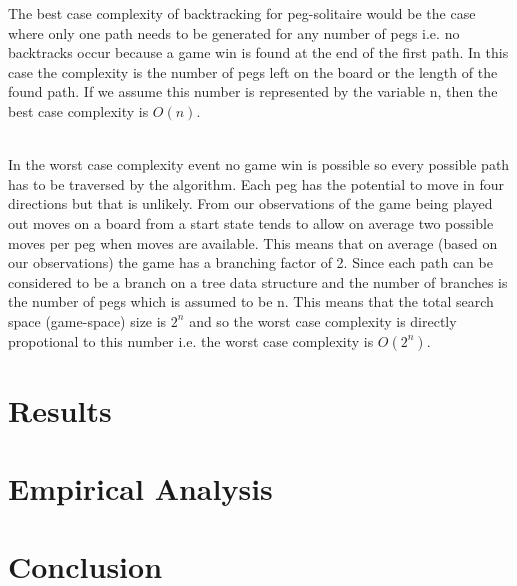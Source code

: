 \documentclass[a4paper]{article}
\begin{document}
\noindent The best case complexity of backtracking for peg-solitaire would be the case where only one path needs to be generated for any number of pegs i.e. no backtracks occur because a game win is found at the end of the first path. In this case the complexity is the number of pegs left on the board or the length of the found path. If we assume this number is represented by the variable n, then the best case complexity is $O(n)$.\\\


\noindent In the worst case complexity event no game win is possible so every possible path has to be traversed by the algorithm. Each peg has the potential to move in four directions but that is unlikely. From our observations of the game being played out moves on a board from a start state tends to allow on average two possible moves per peg when moves are available. This means that on average (based on our observations) the game has a branching factor of 2. Since each path can be considered to be a branch on a tree data structure and the number of branches is the number of pegs which is assumed to be n. This means that the total search space (game-space) size is $2^n$ and so the worst case complexity is directly propotional to this number i.e. the worst case complexity is $O(2^n)$. 

\section{Results}

\section{Empirical Analysis}


\section{Conclusion}
\end{document}
